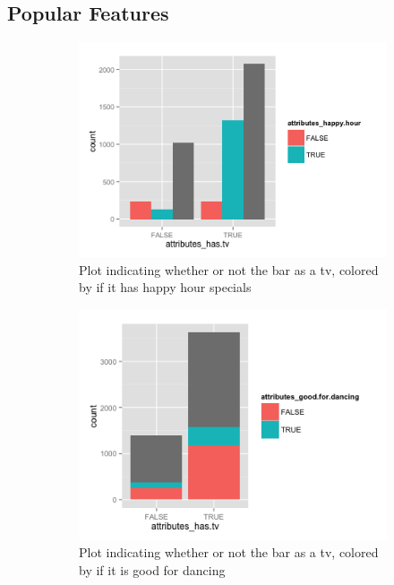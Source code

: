 \documentclass[11pt]{article}
\begin{document}
\subsection{Popular Features}
\begin{figure}
\centering
\begin{subfigure}{.5\textwidth}
  \centering
  \includegraphics[width=1\linewidth]{Figures/tvhappyhour.png}
  \caption{Plot indicating whether or not the bar as a tv, colored by if it has happy hour specials}
  \label{happy}
\end{subfigure}%
\begin{subfigure}{.5\textwidth}
  \centering
  \includegraphics[width=1\linewidth]{Figures/tvdancing.png}
  \caption{Plot indicating whether or not the bar as a tv, colored by if it is good for dancing}
  \label{dance}
\end{subfigure}
\caption{}
\label{}
\end{figure}
\end{document}
